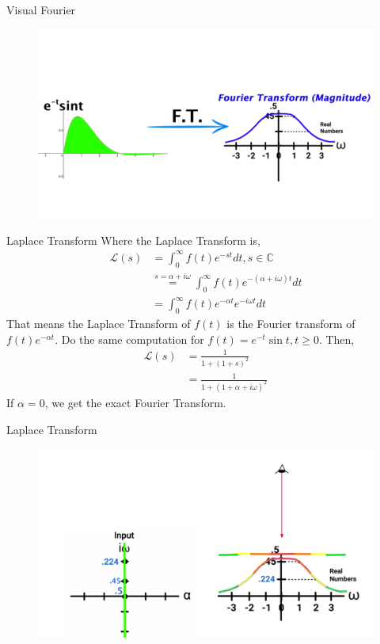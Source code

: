 \documentclass[11pt]{beamer}
\theoremstyle{plain}
\begin{document}
\begin{frame}{Visual Fourier}
    \begin{figure}
        \centering
        \includegraphics[width=1\linewidth]{Fourier_01_graph.png}
    \end{figure}
\end{frame}


\begin{frame}{Laplace Transform}
    Where the Laplace Transform is,
    \begin{align*}
        \mathcal L(s) &= \int_0^\infty f(t) e^{-st}dt, s\in\mathbb C\\
        &\stackrel{s=\alpha+i\omega}{=} \int_0^\infty f(t) e^{-(\alpha+i\omega)t}dt\\
        &= \int_0^\infty f(t) e^{-\alpha t}e^{-i\omega t}dt
    \end{align*}
    That means the Laplace Transform of $f(t)$ is the Fourier transform of $f(t)e^{-\alpha t}$. Do the same computation for $f(t)=e^{-t}\sin t,t\geq 0$. Then,
    \begin{align*}
        \mathcal L(s) &= \frac{1}{1+(1+s)^2}\\
        &= \frac{1}{1+(1+\alpha+i\omega)^2}
    \end{align*}
If $\alpha=0$, we get the exact Fourier Transform. 
\end{frame}

\begin{frame}{Laplace Transform}
    \begin{figure}
        \centering
        \includegraphics[width=1\linewidth]{Laplace_02_graph.png}
    \end{figure}
\end{frame}
\end{document}

